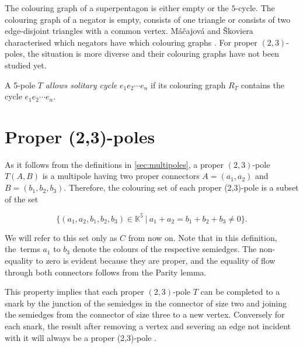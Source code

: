 The colouring graph of a superpentagon is either empty or the $5$-cycle. The colouring graph of a negator is empty, consists of one triangle or consists of two edge-disjoint triangles with a common vertex.
Máčajová and Škoviera characterised which negators have which colouring graphs \cite{IrreducibleSnarksSkoviera}.
For proper $(2,3)$-poles, the situation is more diverse and their colouring graphs have not been studied yet.


A 5-pole $T$ \textit{allows solitary cycle} $e_1e_2\cdots e_n$ if its colouring graph $R_T$ contains the cycle $e_1e_2\cdots e_n$.


\section{Proper (2,3)-poles}\label{ch:proper-23-poles}

As it follows from the definitions in \cref{sec:multipoles}, a proper $(2,3)$-pole $T(A,B)$ is a multipole having two proper connectors $A=(a_1,a_2)$ and $B=(b_1,b_2,b_3)$. Therefore, the colouring set of each proper (2,3)-pole is a subset of the set

$$\{(a_1,a_2,b_1,b_2,b_3)\in\mathbb{K}^5~|~a_1+a_2=b_1+b_2+b_3\neq 0\}.$$

We will refer to this set only as $C$ from now on. Note that in this definition, the~terms $a_1$ to $b_3$ denote the colours of the respective semiedges. The non-equality to zero is evident because they are proper, and the equality of flow through both connectors follows from the Parity lemma.

This property implies that each proper $(2,3)$-pole $T$ can be completed to a snark by the junction of the semiedges in the connector of size two and joining the semiedges from the connector of size three to a new vertex. Conversely for each snark, the result after removing a vertex and severing an edge not incident with it will always be a proper (2,3)-pole \cite{MorphologyOfSmall}.

